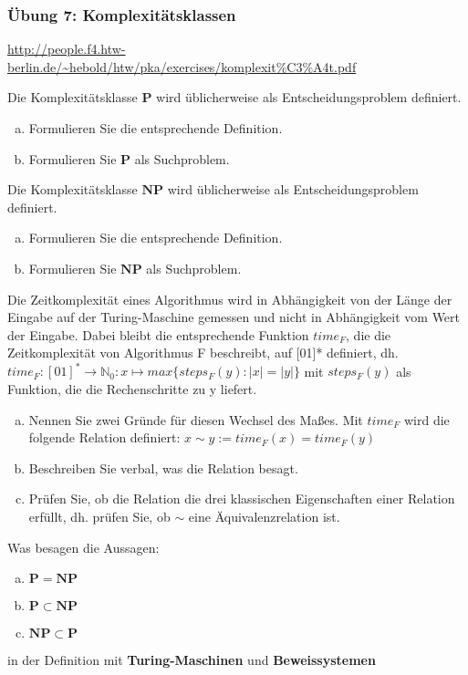 \begin{card}
	\frametitle{Übung 7: Komplexitätsklassen}
	\url{http://people.f4.htw-berlin.de/~hebold/htw/pka/exercises/komplexit\%C3\%A4t.pdf}
\end{card}

\begin{card}
	Die Komplexitätsklasse $\mathbf{P}$ wird üblicherweise als Entscheidungsproblem definiert.
	\begin{enumerate}[a)]
	\item Formulieren Sie die entsprechende Definition.
	\item Formulieren Sie $\mathbf{P}$ als Suchproblem.
	\end{enumerate}
	\hr
\end{card}

\begin{card}
	Die Komplexitätsklasse $\mathbf{NP}$ wird üblicherweise als Entscheidungsproblem definiert.
	\begin{enumerate}[a)]
	\item Formulieren Sie die entsprechende Definition.
	\item Formulieren Sie $\mathbf{NP}$ als Suchproblem. 
	\end{enumerate}
	\hr
\end{card}

\begin{card}
	Die Zeitkomplexität eines Algorithmus wird in Abhängigkeit von der Länge der Eingabe auf der Turing-Maschine gemessen und nicht in Abhängigkeit vom Wert der Eingabe. Dabei bleibt die entsprechende Funktion $time_F$, die die Zeitkomplexität von Algorithmus F beschreibt, auf [01]* definiert, dh.
	$time_F:[01]^* \rightarrow \mathbb{N}_0 : x \mapsto max \{ steps_F(y):|x| = |y| \}$
	mit $steps_F(y)$ als Funktion, die die Rechenschritte zu y liefert. 
	\begin{enumerate}[a)]
	\item Nennen Sie zwei Gründe für diesen Wechsel des Maßes. Mit
	$time_F$ wird die folgende Relation definiert: 
	$x \sim y := time_F(x) = time_F(y)$
	\item Beschreiben Sie verbal, was die Relation besagt.
	\item Prüfen Sie, ob die Relation die drei klassischen Eigenschaften einer Relation erfüllt, dh. prüfen Sie, ob $\sim$ eine Äquivalenzrelation ist. 
	\end{enumerate}
	\hr
\end{card}

\begin{card}
	Was besagen die Aussagen: 
	\begin{enumerate}[a)]
	\item $\mathbf{P = NP}$
	\item $\mathbf{P \subset NP}$
	\item $\mathbf{NP \subset P}$
	\end{enumerate}
	in der Definition mit \textbf{Turing-Maschinen} und \textbf{Beweissystemen}
	\hr
\end{card}

